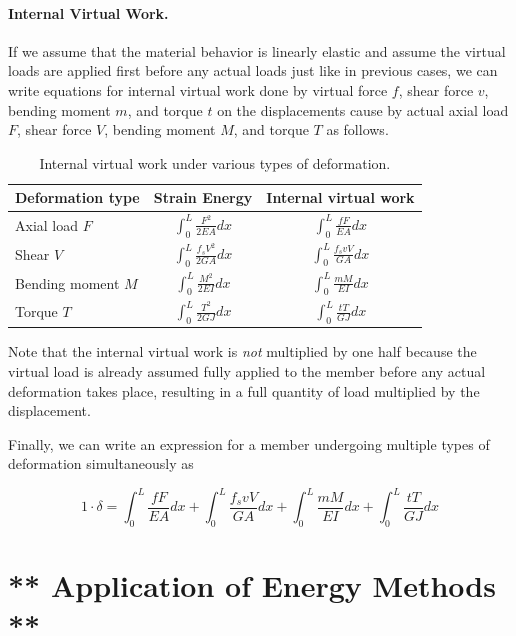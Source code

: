 \documentclass[
10pt,
a4paper,
openany,
svgnames,
]{kaobook} %
\begin{document}
\paragraph{Internal Virtual Work.}

If we assume that the material behavior is linearly elastic and assume the virtual loads are applied first before any actual loads just like in previous cases, we can write equations for internal virtual work done by virtual force $f$, shear force $v$, bending moment $m$, and torque $t$ on the displacements cause by actual axial load $F$, shear force $V$, bending moment $M$, and torque $T$ as follows.

\begin{table}[h]
  \centering
  \caption{Internal virtual work under various types of deformation.}
  \begin{tabular}{l c c}
    \toprule
    Deformation type & Strain Energy & Internal virtual work \\
    \midrule
    Axial load $F$ & $\displaystyle \int_0^L \frac{F^2}{2EA} dx$ & $\displaystyle \int_0^L \frac{fF}{EA} dx $ \\[2em]
    Shear $V$ & $\displaystyle \int_0^L \frac{f_s V^2}{2GA} dx$ & $\displaystyle \int_0^L \frac{f_s vV}{GA} dx$ \\[2em]
    Bending moment $M$ & $\displaystyle \int_0^L \frac{M^2}{2EI} dx$ & $\displaystyle \int_0^L \frac{mM}{EI} dx$ \\[2em]
    Torque $T$ & $\displaystyle \int_0^L \frac{T^2}{2GJ} dx$ & $\displaystyle \int_0^L \frac{tT}{GJ} dx$ \\
    \bottomrule
  \end{tabular}
\end{table}

Note that the internal virtual work is \emph{not} multiplied by one half because the virtual load is already assumed fully applied to the member before any actual deformation takes place, resulting in a full quantity of load multiplied by the displacement.

Finally, we can write an expression for a member undergoing multiple types of deformation simultaneously as

\begin{equation}
  1 \cdot \delta = \int_0^L \frac{fF}{EA} dx + \int_0^L \frac{f_s vV}{GA} dx + \int_0^L \frac{mM}{EI} dx + \int_0^L \frac{tT}{GJ} dx
\end{equation}

\section{** Application of Energy Methods **}
\end{document}
